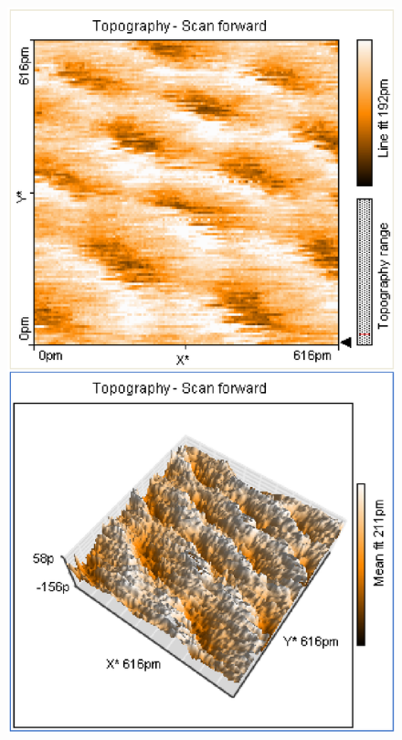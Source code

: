 \documentclass[12pt]{article}
\begin{document}
\begin{figure}[H]  
\begin{minipage}{0.4\linewidth}
\centering
\includegraphics[width=0.9\linewidth]{../plot/data/graphit/graphit4-2.eps}
\end{minipage}
\begin{minipage}{0.2\linewidth}
\centering
\end{minipage}
\begin{minipage}{0.4\linewidth}
\centering

\end{minipage}
\end{figure}
\end{document}
